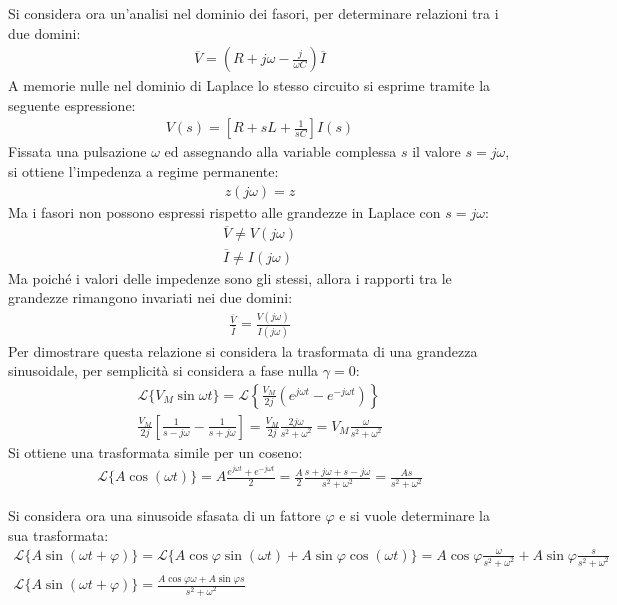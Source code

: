 \documentclass{article}
\numberwithin{equation}{subsection}
\begin{document}
Si considera ora un'analisi nel dominio dei fasori, per determinare relazioni tra i due domini: 
\begin{gather*}
    \overline{V}=\left(R+j\omega-\displaystyle\frac{j}{\omega C}\right)\overline{I}
\end{gather*}
A memorie nulle nel dominio di Laplace lo stesso circuito si esprime tramite la seguente espressione:
\begin{gather*}
    V(s)=\left[R+sL+\displaystyle\frac{1}{sC}\right]I(s)
\end{gather*}
Fissata una pulsazione $\omega$ ed assegnando alla variable complessa $s$ il valore $s=j\omega$, si ottiene l'impedenza a regime permanente:
\begin{gather*}
    z(j\omega)=z
\end{gather*}
Ma i fasori non possono espressi rispetto alle grandezze in Laplace con $s=j\omega$:
\begin{gather*}
    \overline{V}\neq V(j\omega)\\
    \overline{I}\neq I(j\omega)
\end{gather*}
Ma poiché i valori delle impedenze sono gli stessi, allora i rapporti tra le grandezze rimangono invariati nei due domini:
\begin{gather*}
    \displaystyle\frac{\overline{V}}{\overline{I}}=\frac{V(j\omega)}{I(j\omega)}
\end{gather*}
Per dimostrare questa relazione si considera la trasformata di una grandezza sinusoidale, per semplicità si considera a fase nulla $\gamma=0$: 
\begin{gather*}
    \mathcal{L}\{V_M\sin\omega t\}=\mathcal{L}\left\{\displaystyle\frac{V_M}{2j}\left(e^{j\omega t}-e^{-j\omega t}\right)\right\}\\
    \frac{V_M}{2j}\left[\frac{1}{s-j\omega}-\frac{1}{s+j\omega}\right]=\frac{V_M}{2j}\frac{2j\omega}{s^2+\omega^2}=V_M\frac{\omega}{s^2+\omega^2}
\end{gather*}
Si ottiene una trasformata simile per un coseno:
\begin{gather*}
    \mathcal{L}\{A\cos(\omega t)\}=A\displaystyle\frac{e^{j\omega t}+e^{-j\omega t}}{2}=\frac{A}{2}\frac{s+j\omega+s-j\omega}{s^2+\omega^2}=\frac{As}{s^2+\omega^2}
\end{gather*}

Si considera ora una sinusoide sfasata di un fattore $\varphi$ e si vuole determinare la sua trasformata:
\begin{gather*}
    \mathcal{L}\{A\sin(\omega t+\varphi)\}=\mathcal{L}\{A\cos\varphi\sin(\omega t)+A\sin\varphi\cos(\omega t)\}=\displaystyle A\cos\varphi\frac{\omega}{s^2+\omega^2}+A\sin\varphi\frac{s}{s^2+\omega^2}\\
    \mathcal{L}\{A\sin(\omega t+\varphi)\}=\displaystyle\frac{A\cos\varphi \omega+A\sin\varphi s}{s^2+\omega^2}
\end{gather*}
\end{document}

